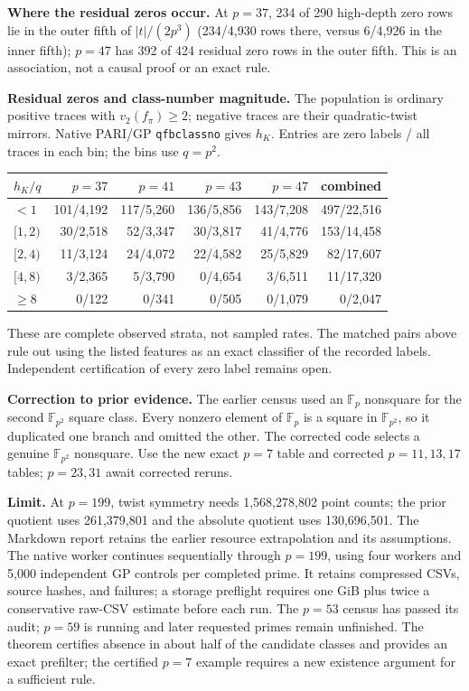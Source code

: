 \documentclass[10pt]{extarticle}
\begin{document}
\noindent\textbf{Where the residual zeros occur.} At $p=37$,
234 of 290 high-depth zero rows lie in the outer fifth of
$|t|/(2p^3)$ (234/4,930 rows there, versus 6/4,926 in the inner
fifth); $p=47$ has 392 of 424 residual zero rows in the outer fifth.
This is an association, not a causal proof or an exact rule.

\medskip
\noindent\textbf{Residual zeros and class-number magnitude.}
The population is ordinary positive traces with $v_2(f_\pi)\geq2$;
negative traces are their quadratic-twist mirrors. Native PARI/GP
\texttt{qfbclassno} gives $h_K$. Entries are zero labels / all traces in
each bin; the bins use $q=p^2$.
\begin{center}
\begingroup
\setlength{\tabcolsep}{8pt}
\begin{tabular}{@{}l r r r r r@{}}
\toprule
$h_K/q$ & $p=37$ & $p=41$ & $p=43$ & $p=47$ & combined \\
\midrule
$<1$ & 101/4,192 & 117/5,260 & 136/5,856 & 143/7,208 & 497/22,516 \\
$[1,2)$ & 30/2,518 & 52/3,347 & 30/3,817 & 41/4,776 & 153/14,458 \\
$[2,4)$ & 11/3,124 & 24/4,072 & 22/4,582 & 25/5,829 & 82/17,607 \\
$[4,8)$ & 3/2,365 & 5/3,790 & 0/4,654 & 3/6,511 & 11/17,320 \\
$\geq8$ & 0/122 & 0/341 & 0/505 & 0/1,079 & 0/2,047 \\
\bottomrule
\end{tabular}
\endgroup
\end{center}
\noindent These are complete observed strata, not sampled rates.
The matched pairs above rule out using the listed features as an exact
classifier of the recorded labels. Independent certification of every
zero label remains open.

\medskip
\noindent\textbf{Correction to prior evidence.} The earlier census
used an $\mathbb F_p$ nonsquare for the second
$\mathbb F_{p^2}$ square class. Every nonzero element of $\mathbb F_p$
is a square in $\mathbb F_{p^2}$, so it duplicated one branch and
omitted the other. The corrected code selects a genuine
$\mathbb F_{p^2}$ nonsquare. Use the new exact $p=7$ table and corrected
$p=11,13,17$ tables; $p=23,31$ await corrected reruns.

\noindent\textbf{Limit.} At $p=199$, twist symmetry needs 1,568,278,802
point counts; the prior quotient uses 261,379,801 and the absolute
quotient uses 130,696,501.
The Markdown report retains the earlier resource extrapolation and its
assumptions.
The native worker continues sequentially through $p=199$, using four
workers and 5,000 independent GP controls per completed prime. It
retains compressed CSVs, source hashes, and failures; a storage preflight
requires one GiB plus twice a conservative raw-CSV estimate before each run.
The $p=53$ census has passed its audit; $p=59$ is running and later
requested primes remain unfinished.
The theorem certifies absence in about half of the candidate classes and
provides an exact prefilter; the certified $p=7$ example requires a new
existence argument for a sufficient rule.
\end{document}
